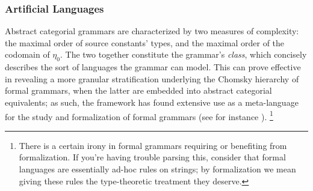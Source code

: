 \subsubsection{Artificial Languages}
Abstract categorial grammars are characterized by two measures of complexity: the maximal order of source constants' types, and the maximal order of the codomain of $\eta_0$.
The two together constitute the grammar's \textit{class}, which concisely describes the sort of languages the grammar can model.
This can prove effective in revealing a more granular stratification underlying the Chomsky hierarchy of formal grammars, when the latter are embedded into abstract categorial equivalents; as such, the framework has found extensive use as a meta-language for the study and formalization of formal grammars (see for instance \citet{de2004expressive}).%
\footnote{There is a certain irony in formal grammars requiring or benefiting from formalization. If you're having trouble parsing this, consider that formal languages are essentially ad-hoc rules on strings; by formalization we mean giving these rules the type-theoretic treatment they deserve.}

\todo

